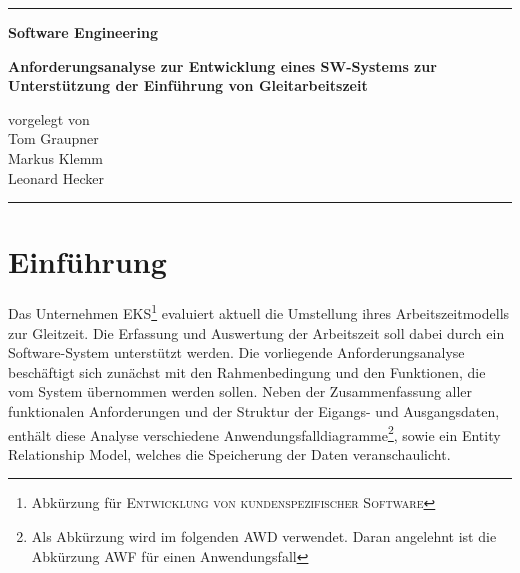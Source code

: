 


\begin{titlepage}
	\vspace*{\fill}

	\rule{\textwidth}{0.25pt}

	\vspace*{1cm}

	\begin{singlespace}
		\begin{center}	\Large	\bfseries
			Software Engineering
		\end{center}
	\end{singlespace}

	\vspace{2em}

	\begin{singlespace}
		\begin{center}	\bfseries
				Anforderungsanalyse zur Entwicklung
			eines SW-Systems zur Unterstützung
			der Einführung von Gleitarbeitszeit
		\end{center}
	\end{singlespace}

	\vspace*{6cm}

	\begin{center}
		vorgelegt von \\
		\vspace{2em}
		Tom Graupner \\
		Markus Klemm \\
		Leonard Hecker
	\end{center}

	\vspace*{1cm}

	\rule{\textwidth}{0.25pt}

	\vspace*{\fill}
\end{titlepage}


\tableofcontents


\chapter{Einführung}
Das Unternehmen \textsc{EKS}\footnote{Abkürzung für \textsc{Entwicklung von kundenspezifischer Software}} evaluiert aktuell die Umstellung ihres Arbeitszeitmodells zur Gleitzeit. Die Erfassung und Auswertung der Arbeitszeit soll dabei durch ein Software-System unterstützt werden. Die vorliegende Anforderungsanalyse beschäftigt sich zunächst mit den Rahmenbedingung und den Funktionen, die vom System übernommen werden sollen. Neben der Zusammenfassung aller funktionalen Anforderungen und der Struktur der Eigangs- und Ausgangsdaten, enthält diese Analyse verschiedene Anwendungsfalldiagramme\footnote{Als Abkürzung wird im folgenden \textsc{AWD} verwendet. Daran angelehnt ist die Abkürzung \textsc{AWF} für einen Anwendungsfall}, sowie ein Entity Relationship Model, welches die Speicherung der Daten veranschaulicht.

